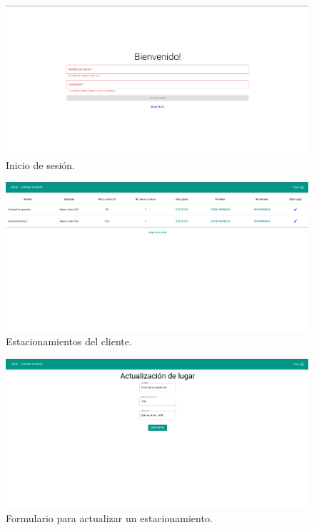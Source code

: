 \begin{figure}[bth]
    \centering
    \includegraphics[width=\textwidth]{imgs/server/login.png}
    \caption{Inicio de sesión.}
    \label{fig:login}
\end{figure}

\begin{figure}[bth]
    \centering
    \includegraphics[width=\textwidth]{imgs/server/places.png}
    \caption{Estacionamientos del cliente.}
    \label{fig:home}
\end{figure}

\begin{figure}[bth]
    \centering
    \includegraphics[width=\textwidth]{imgs/server/update-place.png}
    \caption{Formulario para actualizar un estacionamiento.}
    \label{fig:update-place}
\end{figure}


